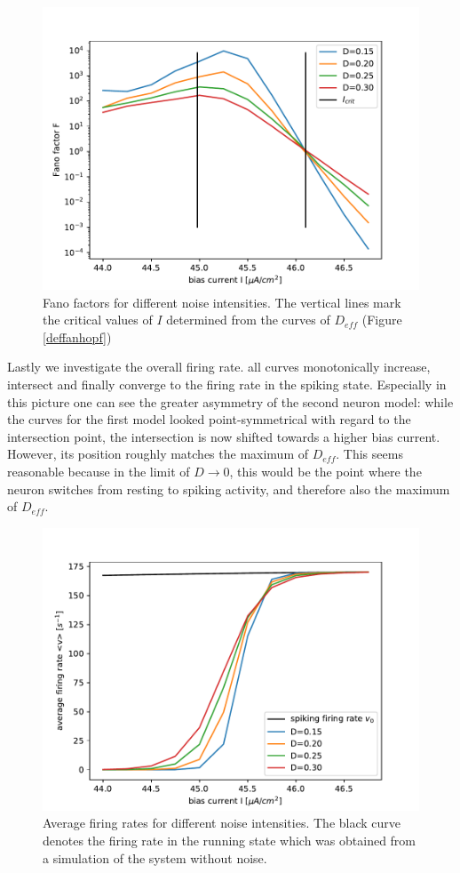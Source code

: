 \documentclass[12pt,a4paper]{article}
\begin{document}
\begin{figure}[H]
	\centering
	\includegraphics[scale=1]{fneur3critrealanhopf26flogrealanhopf19flog.pdf}\caption{Fano factors for different noise intensities. The vertical lines mark the critical values of $I$ determined from the curves of $D_{eff}$ (Figure \ref{deffanhopf})}
	\label{fanoanhopf}
\end{figure}
Lastly we investigate the overall firing rate. all curves monotonically increase, intersect and finally converge to the firing rate in the spiking state. Especially in this picture one can see the greater asymmetry of the second neuron model: while the curves for the first model looked point-symmetrical with regard to the intersection point, the intersection is now shifted towards a higher bias current. However, its position roughly matches the maximum of $D_{eff}$. This seems reasonable because in the limit of $D\rightarrow0$, this would be the point where the neuron switches from resting to spiking activity, and therefore also the maximum of $D_{eff}$.
\begin{figure}[H]
	\centering
	\includegraphics[scale=1]{gneur3critsprealanhopf26flogrealanhopf19flog.pdf}\caption{Average firing rates for different noise intensities. The black curve denotes the firing rate in the running state which was obtained from a simulation of the system without noise.}
	\label{rateanhopf}
\end{figure}
\end{document}
